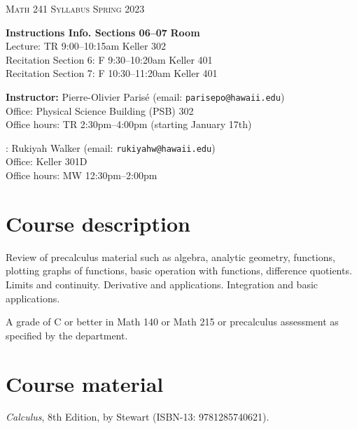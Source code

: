 \documentclass[12pt]{amsart}
\newcommand{\spacer}{\vspace{.2cm}}
\newcommand{\svs}{\vspace{.1cm}}
\begin{document}
\thispagestyle{empty}

\begin{center}
\textsc{Math 241} \hfill {\Large\textsc{Syllabus}} \hfill \textsc{Spring 2023}
\end{center}

\noindent\hrulefill

\noindent\textbf{Instructions Info. Sections 06--07} \hfill \textbf{Room} \\
\noindent Lecture: TR 9:00--10:15am \hfill Keller 302\\
Recitation Section 6: F 9:30--10:20am \hfill Keller 401\\
Recitation Section 7: F 10:30--11:20am \hfill Keller 401

\noindent\hrulefill

\spacer

\noindent\textbf{Instructor:} Pierre-Olivier Paris{\'e} (email: \texttt{parisepo@hawaii.edu})\\
Office: Physical Science Building (PSB) 302\\
Office hours: TR 2:30pm--4:00pm (starting January 17th)

\spacer

: Rukiyah Walker (email: \texttt{rukiyahw@hawaii.edu})\\
Office: Keller 301D\\
Office hours: MW 12:30pm--2:00pm

\noindent\hrulefill

\section*{Course description}
Review of precalculus material such as algebra, analytic geometry, functions, plotting graphs of functions, basic operation with functions, difference quotients. Limits and continuity. Derivative and applications. Integration and basic applications.\svs

A grade of C or better in Math 140 or Math 215 or precalculus assessment as specified by the department.

\section*{Course material}

 \emph{Calculus}, 8th Edition, by Stewart (ISBN-13: 9781285740621). 
\end{document}
